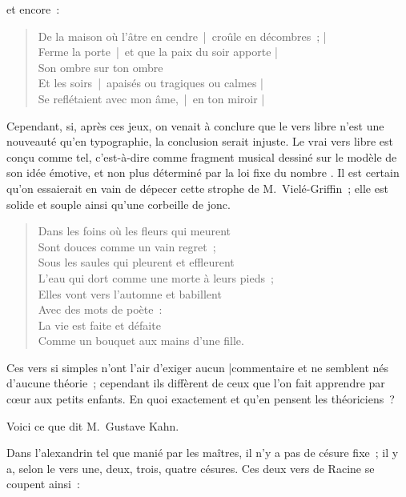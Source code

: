 \documentclass[french,twoside]{book} %
\newcommand{\bibl}[1]{{\RaggedLeft{#1}\par\bigskip}}
\newenvironment{quoteblock}%
  {\begin{quoting}}
  {\end{quoting}}
\newenvironment{quotebar}{%
    \def\FrameCommand{{\color{rubric!10!}\vrule width 0.5em} \hspace{0.9em}}%
    \def\OuterFrameSep{\itemsep} %
    \MakeFramed {\advance\hsize-\width \FrameRestore}
  }%
  {%
    \endMakeFramed
  }
\renewenvironment{quoteblock}%
  {%
    \savenotes
    \setstretch{0.9}
    \normalfont
    \begin{quotebar}
  }
  {%
    \end{quotebar}
    \spewnotes
  }
\begin{document}
\noindent et encore :\par


\begin{verse}
De la maison où l’âtre en cendre | croûle en décombres ; |\\
Ferme la porte | et que la paix du soir apporte |\\
Son ombre sur ton ombre\\
Et les soirs | apaisés ou tragiques ou calmes |\\
Se reflétaient avec mon âme, | en ton miroir |\\
\end{verse}
\begin{quoteblock}

\bibl{(Poèmes.)}
\end{quoteblock}

\noindent Cependant, si, après ces jeux, on venait à conclure que le vers libre n’est une nouveauté qu’en typographie, la conclusion serait injuste. Le vrai vers libre est conçu comme tel, c’est-à-dire comme fragment musical dessiné sur le modèle de son idée émotive, et non plus déterminé par la loi fixe du nombre . Il est certain qu’on essaierait en vain de dépecer cette strophe de M. Vielé-Griffin ; elle est solide et souple ainsi qu’une corbeille de jonc.\par


\begin{verse}
Dans les foins où les fleurs qui meurent\\
Sont douces comme un vain regret ;\\
Sous les saules qui pleurent et effleurent\\
L’eau qui dort comme une morte à leurs pieds ;\\
Elles vont vers l’automne et babillent\\
Avec des mots de poète :\\
La vie est faite et défaite\\
Comme un bouquet aux mains d’une fille.\\
\end{verse}

\noindent Ces vers si simples n’ont l’air d’exiger aucun |commentaire et ne semblent nés d’aucune théorie ; cependant ils diffèrent de ceux que l’on fait apprendre par cœur aux petits enfants. En quoi exactement et qu’en pensent les théoriciens ?\par
Voici ce que dit M. Gustave Kahn.\par
Dans l’alexandrin tel que manié par les maîtres, il n’y a pas de césure fixe ; il y a, selon le vers une, deux, trois, quatre césures. Ces deux vers de Racine se coupent ainsi :\par
\end{document}

